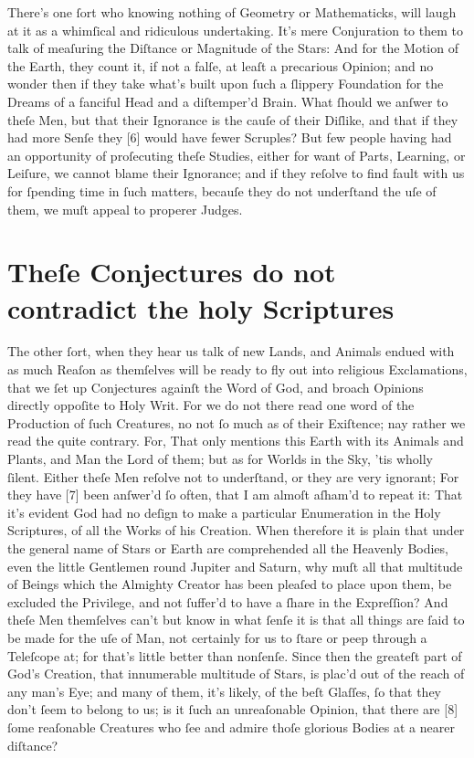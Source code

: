 \documentclass[letterpaper]{book}
\begin{document}
There's one ſort who knowing nothing of Geometry or Mathematicks, will laugh
at it as a whimſical and ridiculous undertaking. It's mere Conjuration to
them to talk of meaſuring the Diſtance or Magnitude of the Stars: And for
the Motion of the Earth, they count it, if not a falſe, at leaſt a
precarious Opinion; and no wonder then if they take what's built upon ſuch a
ſlippery Foundation for the Dreams of a fanciful Head and a diſtemper'd
Brain.  What ſhould we anſwer to theſe Men, but that their Ignorance is the
cauſe of their Diſlike, and that if they had more Senſe they [6] would have
fewer Scruples? But few people having had an opportunity of proſecuting
theſe Studies, either for want of Parts, Learning, or Leiſure, we cannot
blame their Ignorance; and if they reſolve to find fault with us for
ſpending time in ſuch matters, becauſe they do not underſtand the uſe of
them, we muſt appeal to properer Judges.


\section{Theſe Conjectures do not contradict the holy Scriptures}

The other ſort, when they hear us talk of new Lands, and Animals endued with
as much Reaſon as themſelves will be ready to fly out into religious
Exclamations, that we ſet up Conjectures againſt the Word of God, and broach
Opinions directly oppoſite to Holy Writ. For we do not there read one word
of the Production of ſuch Creatures, no not ſo much as of their Exiſtence;
nay rather we read the quite contrary. For, That only mentions this Earth
with its Animals and Plants, and Man the Lord of them; but as for Worlds in
the Sky, 'tis wholly ſilent. Either theſe Men reſolve not to underſtand, or
they are very ignorant; For they have [7] been anſwer'd ſo often, that I am
almoſt aſham'd to repeat it: That it's evident God had no deſign to make a
particular Enumeration in the Holy Scriptures, of all the Works of his
Creation. When therefore it is plain that under the general name of Stars or
Earth are comprehended all the Heavenly Bodies, even the little Gentlemen
round Jupiter and Saturn, why muſt all that multitude of Beings which the
Almighty Creator has been pleaſed to place upon them, be excluded the
Privilege, and not ſuffer'd to have a ſhare in the Expreſſion?  And theſe
Men themſelves can't but know in what ſenſe it is that all things are ſaid
to be made for the uſe of Man, not certainly for us to ſtare or peep through a
Teleſcope at; for that's little better than nonſenſe. Since then the
greateſt part of God's Creation, that innumerable multitude of Stars, is
plac'd out of the reach of any man's Eye; and many of them, it's likely, of
the beſt Glaſſes, ſo that they don't ſeem to belong to us; is it ſuch an
unreaſonable Opinion, that there are [8] ſome reaſonable Creatures who ſee
and admire thoſe glorious Bodies at a nearer diſtance?
\end{document}
